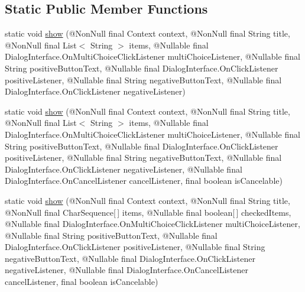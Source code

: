 \subsection*{Static Public Member Functions}
\begin{DoxyCompactItemize}
\item 
static void \hyperlink{classcom_1_1toast_1_1android_1_1gamebase_1_1base_1_1ui_1_1_simple_multi_choice_dialog_ace87d54d3c2e079150be0c80e4ad5f4f}{show} (@Non\+Null final Context context, @Non\+Null final String title, @Non\+Null final List$<$ String $>$ items, @Nullable final Dialog\+Interface.\+On\+Multi\+Choice\+Click\+Listener multi\+Choice\+Listener, @Nullable final String positive\+Button\+Text, @Nullable final Dialog\+Interface.\+On\+Click\+Listener positive\+Listener, @Nullable final String negative\+Button\+Text, @Nullable final Dialog\+Interface.\+On\+Click\+Listener negative\+Listener)
\item 
static void \hyperlink{classcom_1_1toast_1_1android_1_1gamebase_1_1base_1_1ui_1_1_simple_multi_choice_dialog_a86ac518b83d512f55746c77621d72ed9}{show} (@Non\+Null final Context context, @Non\+Null final String title, @Non\+Null final List$<$ String $>$ items, @Nullable final Dialog\+Interface.\+On\+Multi\+Choice\+Click\+Listener multi\+Choice\+Listener, @Nullable final String positive\+Button\+Text, @Nullable final Dialog\+Interface.\+On\+Click\+Listener positive\+Listener, @Nullable final String negative\+Button\+Text, @Nullable final Dialog\+Interface.\+On\+Click\+Listener negative\+Listener, @Nullable final Dialog\+Interface.\+On\+Cancel\+Listener cancel\+Listener, final boolean is\+Cancelable)
\item 
static void \hyperlink{classcom_1_1toast_1_1android_1_1gamebase_1_1base_1_1ui_1_1_simple_multi_choice_dialog_a745dc96ff167c04d04d6ceee8a73a6b1}{show} (@Non\+Null final Context context, @Non\+Null final String title, @Non\+Null final Char\+Sequence\mbox{[}$\,$\mbox{]} items, @Nullable final boolean\mbox{[}$\,$\mbox{]} checked\+Items, @Nullable final Dialog\+Interface.\+On\+Multi\+Choice\+Click\+Listener multi\+Choice\+Listener, @Nullable final String positive\+Button\+Text, @Nullable final Dialog\+Interface.\+On\+Click\+Listener positive\+Listener, @Nullable final String negative\+Button\+Text, @Nullable final Dialog\+Interface.\+On\+Click\+Listener negative\+Listener, @Nullable final Dialog\+Interface.\+On\+Cancel\+Listener cancel\+Listener, final boolean is\+Cancelable)
\end{DoxyCompactItemize}


